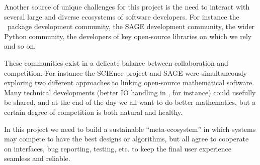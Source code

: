 Another source of unique challenges for this project is the need to
interact with several large and diverse ecosystems of software
developers. For instance the \GAP\ package development community, the
SAGE development community, the wider Python community, the developers
of key open-source libraries on which we rely and so on.

These communities exist in a delicate balance between collaboration
and competition. For instance the SCIEnce project and SAGE were
simultaneously exploring two different approaches to linking
open-source mathematical software. Many technical developments (better
IO handling in \GAP, for instance) could usefully be shared, and at
the end of the day we all want to do better mathematics, but a certain
degree of competition is both natural and healthy.

In this project we need to build a sustainable ``meta-ecosystem'' in
which systems may compete to have the best designs or algorithms, but
all agree to cooperate on interfaces, bug reporting, testing, etc. to
keep the final user experience seamless and reliable.



